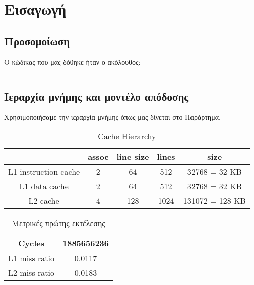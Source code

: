 \documentclass[a4paper,12pt]{article}
\begin{document}
\def\thesection {\arabic{section}. }
\def\thesubsection {\Roman{subsection}) }



\section*{Εισαγωγή}


\subsection{Προσομοίωση}
Ο κώδικας που μας δόθηκε ήταν ο ακόλουθος:

\inputminted[linenos,fontsize=\scriptsize,frame=leftline]{c}{files/partA1-default-partA.c}


\pagebreak


\subsection{Ιεραρχία μνήμης και μοντέλο απόδοσης}

Χρησιμοποιήσαμε την ιεραρχία μνήμης όπως μας δίνεται στο Παράρτημα.

\begin{table}[H]
    \centering
    \begin{tabular}{| c | c | c | c | c |}
        \hline
           & assoc  &   line size &   lines & size\\
        \hline
        \hline
        L1 instruction cache   & 2  &   64  &   512 & 32768 = 32 KB\\
        \hline
        L1 data cache   & 2  &   64  &   512 & 32768 = 32 KB\\
        \hline
        L2 cache  & 4  &   128  &   1024 & 131072 = 128 KB\\
        \hline
    \end{tabular}
    \caption{Cache Hierarchy}
    \label{fig:T2}
\end{table}


\begin{table}[H]
    \centering
    \begin{tabular}{| c | c |}
        \hline
        Cycles & 1885656236 \\
        \hline
        L1 miss ratio & 0.0117 \\
        \hline
        L2 miss ratio & 0.0183 \\
        \hline
    \end{tabular}
    \caption{Μετρικές πρώτης εκτέλεσης}
    \label{fig:T3}
\end{table}
\end{document}
